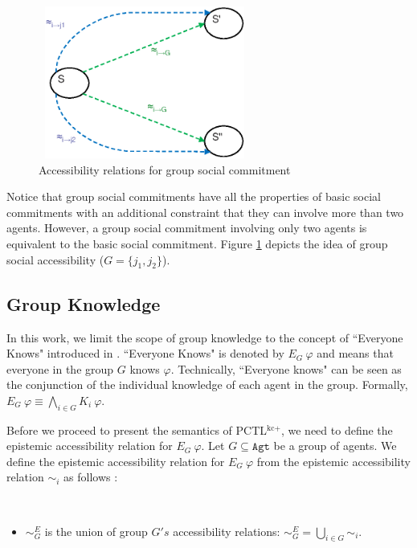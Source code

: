 \begin{figure}[t]
                \begin{center}
                \includegraphics[width=7cm, height=5cm]{chap5/img/group-sc.eps}
                \end{center}
                \caption{Accessibility relations for group social commitment} \label{fig:group-sc}
                \end{figure}

Notice that group social commitments have all the properties of basic social commitments with an additional constraint that they can involve more than two agents. However, a group social commitment involving only two agents is equivalent to the basic social commitment. Figure \ref{fig:group-sc} depicts the idea of group social accessibility ($G=\{j_1, j_2\}$).

\subsection{Group Knowledge}  \label{sec:Group Knowledge}
In this work, we limit the scope of group knowledge to the concept of ``Everyone Knows" introduced in \cite{Fagin1995}. ``Everyone Knows" is denoted by $E_G ~\varphi$ and means that everyone in the group $G$ knows $\varphi$. Technically, ``Everyone knows" can be seen as the conjunction of the individual knowledge of each agent in the group. Formally, $E_G ~\varphi \equiv \bigwedge\limits_{i\in G} K_i ~\varphi$.

Before we proceed to present the semantics of
PCTL$^{\textrm{kc+}}$, we need to define the epistemic
accessibility relation for $E_G ~\varphi$. Let $G\subseteq
\texttt{Agt}$ be a group of agents. We define the epistemic
accessibility relation for $E_G ~\varphi$ from the epistemic
accessibility relation $\sim_i$ as follows \cite{Wan2013}:\\

\begin{definition}  \label{dfn: epistemic relations}~
\begin{itemize}

\item $\sim_G^{E}$ is the union of group $G's$ accessibility
relations: $\sim_G^{E}=\bigcup\limits_{i \in G}\sim_i$.

\end{itemize}
\end{definition}

